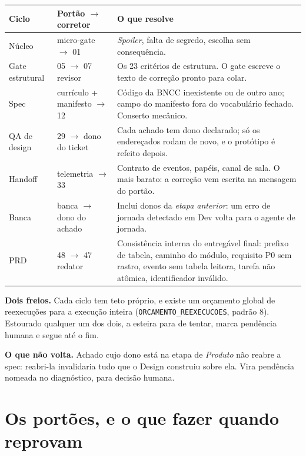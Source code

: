 \documentclass[11pt,a4paper]{article}
\newcommand{\cod}[1]{\texttt{\small #1}}
\begin{document}
\begin{center}
\begin{longtable}{p{2.5cm}p{4.3cm}p{7.6cm}}
\toprule
\textbf{Ciclo} & \textbf{Portão $\rightarrow$ corretor} & \textbf{O que resolve} \\
\midrule
\endfirsthead
Núcleo & micro-gate $\rightarrow$ 01 & \emph{Spoiler}, falta de segredo, escolha sem consequência. \\
\addlinespace
Gate estrutural & 05 $\rightarrow$ 07 revisor & Os 23 critérios de estrutura. O gate escreve o texto de correção pronto para colar. \\
\addlinespace
Spec & currículo + manifesto $\rightarrow$ 12 & Código da BNCC inexistente ou de outro ano; campo do manifesto fora do vocabulário fechado. Conserto mecânico. \\
\addlinespace
QA de design & 29 $\rightarrow$ dono do ticket & Cada achado tem dono declarado; só os endereçados rodam de novo, e o protótipo é refeito depois. \\
\addlinespace
Handoff & telemetria $\rightarrow$ 33 & Contrato de eventos, papéis, canal de sala. O mais barato: a correção vem escrita na mensagem do portão. \\
\addlinespace
Banca & banca $\rightarrow$ dono do achado & Inclui donos da \emph{etapa anterior}: um erro de jornada detectado em Dev volta para o agente de jornada. \\
\addlinespace
PRD & 48 $\rightarrow$ 47 redator & Consistência interna do entregável final: prefixo de tabela, caminho do módulo, requisito P0 sem rastro, evento sem tabela leitora, tarefa não atômica, identificador inválido. \\
\bottomrule
\end{longtable}
\end{center}

\noindent
\textbf{Dois freios.} Cada ciclo tem teto próprio, e existe um orçamento global de
reexecuções para a execução inteira (\cod{ORCAMENTO\_REEXECUCOES}, padrão 8). Estourado
qualquer um dos dois, a esteira para de tentar, marca pendência humana e segue até o fim.

\noindent
\textbf{O que não volta.} Achado cujo dono está na etapa de \emph{Produto} não reabre a spec:
reabri-la invalidaria tudo que o Design construiu sobre ela. Vira pendência nomeada no
diagnóstico, para decisão humana.

\section{Os portões, e o que fazer quando reprovam}
\end{document}
